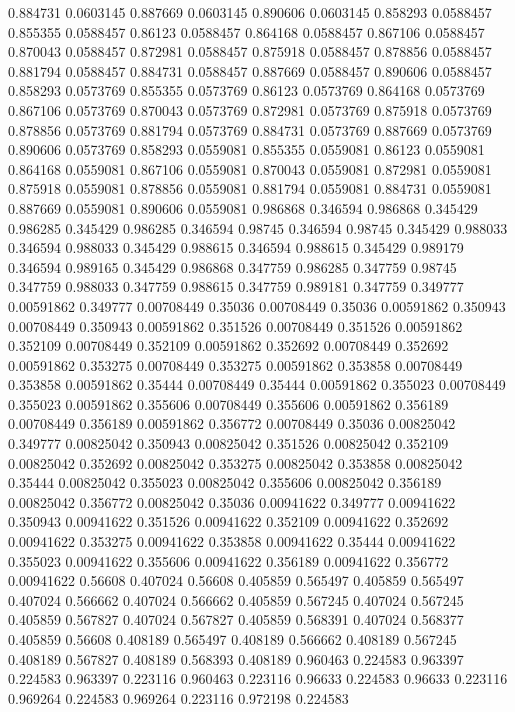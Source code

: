 0.884731 0.0603145
0.887669 0.0603145
0.890606 0.0603145
0.858293 0.0588457
0.855355 0.0588457
0.86123 0.0588457
0.864168 0.0588457
0.867106 0.0588457
0.870043 0.0588457
0.872981 0.0588457
0.875918 0.0588457
0.878856 0.0588457
0.881794 0.0588457
0.884731 0.0588457
0.887669 0.0588457
0.890606 0.0588457
0.858293 0.0573769
0.855355 0.0573769
0.86123 0.0573769
0.864168 0.0573769
0.867106 0.0573769
0.870043 0.0573769
0.872981 0.0573769
0.875918 0.0573769
0.878856 0.0573769
0.881794 0.0573769
0.884731 0.0573769
0.887669 0.0573769
0.890606 0.0573769
0.858293 0.0559081
0.855355 0.0559081
0.86123 0.0559081
0.864168 0.0559081
0.867106 0.0559081
0.870043 0.0559081
0.872981 0.0559081
0.875918 0.0559081
0.878856 0.0559081
0.881794 0.0559081
0.884731 0.0559081
0.887669 0.0559081
0.890606 0.0559081
0.986868 0.346594
0.986868 0.345429
0.986285 0.345429
0.986285 0.346594
0.98745 0.346594
0.98745 0.345429
0.988033 0.346594
0.988033 0.345429
0.988615 0.346594
0.988615 0.345429
0.989179 0.346594
0.989165 0.345429
0.986868 0.347759
0.986285 0.347759
0.98745 0.347759
0.988033 0.347759
0.988615 0.347759
0.989181 0.347759
0.349777 0.00591862
0.349777 0.00708449
0.35036 0.00708449
0.35036 0.00591862
0.350943 0.00708449
0.350943 0.00591862
0.351526 0.00708449
0.351526 0.00591862
0.352109 0.00708449
0.352109 0.00591862
0.352692 0.00708449
0.352692 0.00591862
0.353275 0.00708449
0.353275 0.00591862
0.353858 0.00708449
0.353858 0.00591862
0.35444 0.00708449
0.35444 0.00591862
0.355023 0.00708449
0.355023 0.00591862
0.355606 0.00708449
0.355606 0.00591862
0.356189 0.00708449
0.356189 0.00591862
0.356772 0.00708449
0.35036 0.00825042
0.349777 0.00825042
0.350943 0.00825042
0.351526 0.00825042
0.352109 0.00825042
0.352692 0.00825042
0.353275 0.00825042
0.353858 0.00825042
0.35444 0.00825042
0.355023 0.00825042
0.355606 0.00825042
0.356189 0.00825042
0.356772 0.00825042
0.35036 0.00941622
0.349777 0.00941622
0.350943 0.00941622
0.351526 0.00941622
0.352109 0.00941622
0.352692 0.00941622
0.353275 0.00941622
0.353858 0.00941622
0.35444 0.00941622
0.355023 0.00941622
0.355606 0.00941622
0.356189 0.00941622
0.356772 0.00941622
0.56608 0.407024
0.56608 0.405859
0.565497 0.405859
0.565497 0.407024
0.566662 0.407024
0.566662 0.405859
0.567245 0.407024
0.567245 0.405859
0.567827 0.407024
0.567827 0.405859
0.568391 0.407024
0.568377 0.405859
0.56608 0.408189
0.565497 0.408189
0.566662 0.408189
0.567245 0.408189
0.567827 0.408189
0.568393 0.408189
0.960463 0.224583
0.963397 0.224583
0.963397 0.223116
0.960463 0.223116
0.96633 0.224583
0.96633 0.223116
0.969264 0.224583
0.969264 0.223116
0.972198 0.224583
